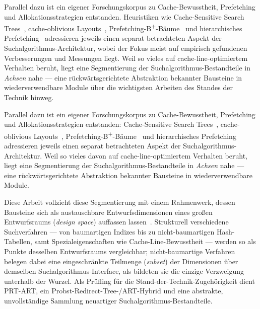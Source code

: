 \begin{nurlang}
Parallel dazu ist ein eigener Forschungskorpus zu Cache-Bewusstheit, Prefetching und
Allokationsstrategien entstanden. Heuristiken wie Cache-Sensitive Search
Trees~\cite{rao1999css, rao2000csb}, cache-oblivious Layouts~\cite{frigo1999cache},
Prefetching-B\textsuperscript{+}-Bäume~\cite{chen2001prefetch} und hierarchisches
Prefetching~\cite{zhang2025hierarchical} adressieren jeweils einen separat betrachteten
Aspekt der Suchalgorithmus-Architektur, wobei der Fokus meist auf empirisch gefundenen Verbesserungen
und Messungen liegt. Weil so vieles auf cache-line-optimiertem Verhalten beruht, liegt eine
Segmentierung der Suchalgorithmus-Bestandteile in \emph{Achsen} nahe --- eine rückwärtsgerichtete
Abstraktion bekannter Bausteine in wiederverwendbare Module über die wichtigsten Arbeiten des Standes
der Technik hinweg.
\end{nurlang}
\begin{nurkurz}
Parallel dazu ist ein eigener Forschungskorpus zu Cache-Bewusstheit, Prefetching und Allokations\-strategien
entstanden: Cache-Sensitive Search Trees~\cite{rao1999css, rao2000csb}, cache-oblivious
Layouts~\cite{frigo1999cache}, Prefetching-B\textsuperscript{+}-Bäume~\cite{chen2001prefetch} und hierarchisches
Prefetching~\cite{zhang2025hierarchical} adressieren jeweils einen separat betrachteten Aspekt der
Suchalgorithmus-Architektur. Weil so vieles davon auf cache-line-optimiertem Verhalten beruht, liegt eine Segmentierung
der Suchalgorithmus-Bestandteile in \emph{Achsen} nahe --- eine rückwärtsgerichtete Abstraktion bekannter
Bausteine in wiederverwendbare Module.
\end{nurkurz}

Diese Arbeit vollzieht diese Segmentierung mit einem Rahmenwerk, dessen Bausteine sich als austauschbare
Entwurfsdimensionen eines großen Entwurfsraums (\emph{design space}) auffassen
lassen~\cite{idreos2018periodic, idreos2018datacalculator}. Strukturell
verschiedene Suchverfahren --- von baumartigen Indizes bis zu nicht-baumartigen Hash-Tabellen, samt
Spezialeigenschaften wie Cache-Line-Bewusstheit --- werden so als Punkte desselben Entwurfsraums vergleichbar;
nicht-baumartige Verfahren belegen dabei eine eingeschränkte Teilmenge (\emph{subset}) der Dimensionen
über demselben Suchalgorithmus-Interface, als bildeten sie die einzige Verzweigung unterhalb der Wurzel. Als
Prüfling für die Stand-der-Technik-Zugehörigkeit dient PRT-ART, ein Probst-Redirect-Tree-/ART-Hybrid und
eine abstrakte, unvollständige Sammlung neuartiger Suchalgorithmus-Bestandteile.

